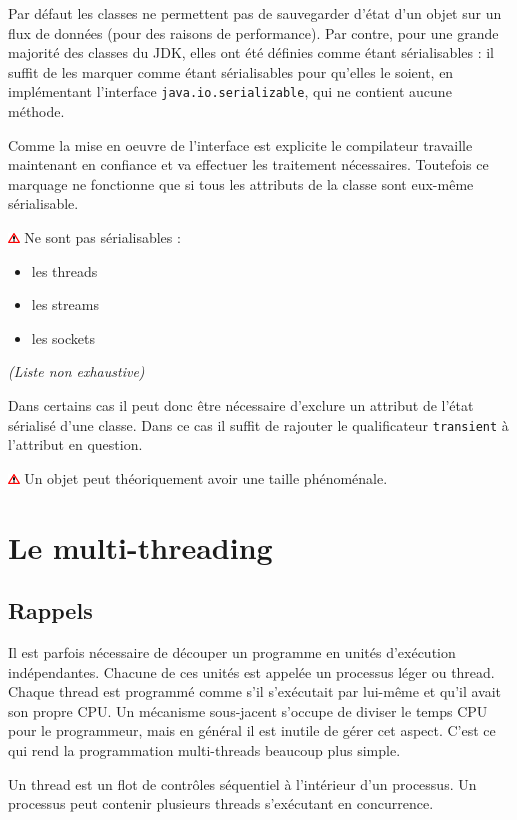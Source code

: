 \documentclass[a4paper,11pt]{report}
\newcommand{\attention}[1]{
	\begin{center}
	\medskip
	\colorbox{attention}{
		\begin{minipage}{0.8\textwidth}\medskip\includegraphics[height=10px]{images/attention.png} #1 \medskip\end{minipage}
	}
	\medskip
	\end{center}
}
\begin{document}
Par défaut les classes ne permettent pas de sauvegarder d\rq{}état d\rq{}un objet sur un flux de données (pour des raisons de performance). Par contre, pour une grande majorité des classes du JDK, elles ont été définies comme étant sérialisables : il suffit de les marquer comme étant sérialisables pour qu\rq{}elles le soient, en implémentant l\rq{}interface \texttt{java.io.serializable}, qui ne contient aucune méthode.

Comme la mise en oeuvre de l\rq{}interface est explicite le compilateur travaille maintenant en confiance et va effectuer les traitement nécessaires. Toutefois ce marquage ne fonctionne que si tous les attributs de la classe sont eux-même sérialisable.

\attention{Ne sont pas sérialisables :
\begin{itemize}
\item les threads
\item les streams
\item les sockets
\end{itemize}
\textit{(Liste non exhaustive)}}

Dans certains cas il peut donc être nécessaire d\rq{}exclure un attribut de l\rq{}état sérialisé d\rq{}une classe. Dans ce cas il suffit de rajouter le qualificateur \texttt{transient} à l\rq{}attribut en question.

\attention{Un objet peut théoriquement avoir une taille phénoménale.}


\section{Le multi-threading}
\subsection{Rappels}
Il est parfois nécessaire de découper un programme en unités d\rq{}exécution indépendantes. Chacune de ces unités est appelée un processus léger ou thread. Chaque thread est programmé comme s\rq{}il s\rq{}exécutait par lui-même et qu\rq{}il avait son propre CPU. Un mécanisme sous-jacent s\rq{}occupe de diviser le temps CPU pour le programmeur, mais en général il est inutile de gérer cet aspect. C\rq{}est ce qui rend la programmation multi-threads beaucoup plus simple.

Un thread est un flot de contrôles séquentiel à l\rq{}intérieur d\rq{}un processus. Un processus peut contenir plusieurs threads s\rq{}exécutant en concurrence.
\end{document}
